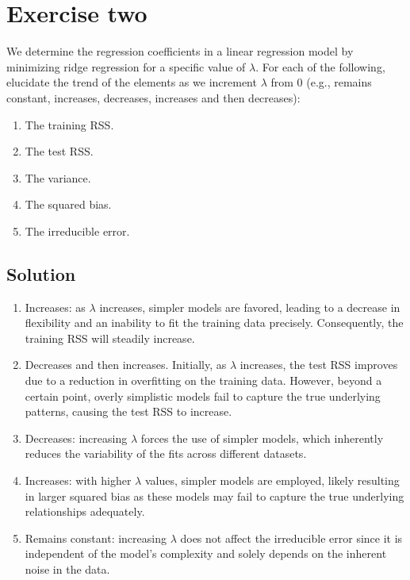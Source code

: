 \section{Exercise two}

We determine the regression coefficients in a linear regression model by minimizing ridge regression for a specific value of $\lambda$. 
For each of the following, elucidate the trend of the elements as we increment $\lambda$ from $0$ (e.g., remains constant, increases, decreases, increases and then decreases):
\begin{enumerate}
    \item The training RSS.\@
    \item The test RSS.\@ 
    \item The variance. 
    \item The squared bias. 
    \item The irreducible error. 
\end{enumerate}

\subsection*{Solution}
\begin{enumerate}
    \item Increases: as $\lambda$ increases, simpler models are favored, leading to a decrease in flexibility and an inability to fit the training data precisely. 
        Consequently, the training RSS will steadily increase.
    \item Decreases and then increases. 
        Initially, as $\lambda$ increases, the test RSS improves due to a reduction in overfitting on the training data. 
        However, beyond a certain point, overly simplistic models fail to capture the true underlying patterns, causing the test RSS to increase.
    \item Decreases: increasing $\lambda$ forces the use of simpler models, which inherently reduces the variability of the fits across different datasets.
    \item Increases: with higher $\lambda$ values, simpler models are employed, likely resulting in larger squared bias as these models may fail to capture the true underlying relationships adequately.
    \item Remains constant: increasing $\lambda$ does not affect the irreducible error since it is independent of the model's complexity and solely depends on the inherent noise in the data.
\end{enumerate}